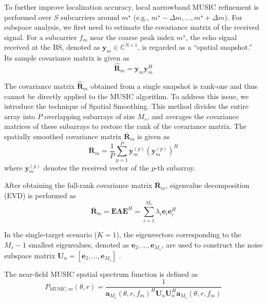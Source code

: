 \documentclass[lettersize,journal]{IEEEtran}
\begin{document}
To further improve localization accuracy, local narrowband MUSIC refinement is performed over $S$ subcarriers around $m^\star$ (e.g., $m^\star - \Delta m, \ldots, m^\star + \Delta m$). For subspace analysis, we first need to estimate the covariance matrix of the received signal. For a subcarrier $f_m$ near the coarse peak index $m^\star$, the echo signal received at the BS, denoted as $\mathbf{y}_m \in \mathbb{C}^{N \times 1}$, is regarded as a “spatial snapshot.” Its sample covariance matrix is given as
	\begin{equation}
		\hat{\mathbf{R}}_m = \mathbf{y}_m \mathbf{y}_m^H
		\label{eq:sample_cov_matrix}
	\end{equation}

The covariance matrix $\hat{\mathbf{R}}_m$ obtained from a single snapshot is rank-one and thus cannot be directly applied to the MUSIC algorithm. To address this issue, we introduce the technique of Spatial Smoothing. This method divides the entire array into $P$ overlapping subarrays of size $M_s$, and averages the covariance matrices of these subarrays to restore the rank of the covariance matrix. The spatially smoothed covariance matrix $\bar{\mathbf{R}}_m$ is given as
\begin{equation}
	\bar{\mathbf{R}}_m = \frac{1}{P} \sum_{p=1}^{P} \mathbf{y}_m^{(p)} (\mathbf{y}_m^{(p)})^H
	\label{eq:spatial_smoothing}
\end{equation}
where $\mathbf{y}_m^{(p)}$ denotes the received vector of the $p$-th subarray.

After obtaining the full-rank covariance matrix $\bar{\mathbf{R}}_m$, eigenvalue decomposition (EVD) is performed as
\begin{equation}
	\bar{\mathbf{R}}_m = \mathbf{E} \mathbf{\Lambda} \mathbf{E}^H = \sum_{i=1}^{M_s} \lambda_i \mathbf{e}_i \mathbf{e}_i^H
\end{equation}

In the single-target scenario ($K=1$), the eigenvectors corresponding to the $M_s-1$ smallest eigenvalues, denoted as ${\mathbf{e}_2, \dots, \mathbf{e}_{M_s}}$, are used to construct the noise subspace matrix $\mathbf{U}_n = [\mathbf{e}_2, \dots, \mathbf{e}_{M_s}]$ .

The near-field MUSIC spatial spectrum function is defined as
\begin{equation}
		P_{\text{MUSIC},m}(\theta, r) = \frac{1}{\mathbf{a}_{M_s}(\theta, r, f_m)^H \mathbf{U}_n \mathbf{U}_n^H \mathbf{a}_{M_s}(\theta, r, f_m)}
		\label{eq:music_spectrum_detail}
\end{equation}
\end{document}
